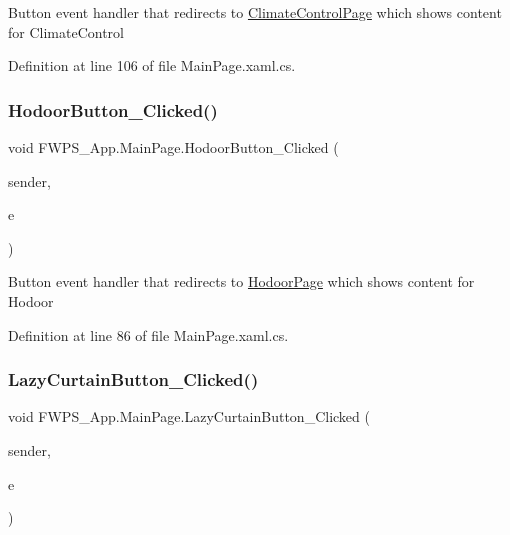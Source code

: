 Button event handler that redirects to \mbox{\hyperlink{class_f_w_p_s___app_1_1_climate_control_page}{Climate\+Control\+Page}} which shows content for Climate\+Control 

Definition at line 106 of file Main\+Page.\+xaml.\+cs.

\mbox{\label{class_f_w_p_s___app_1_1_main_page_a22b37582195ee5fd4fd31602d94b089a}} 
\subsubsection{\texorpdfstring{Hodoor\+Button\+\_\+\+Clicked()}{HodoorButton\_Clicked()}}
{\footnotesize\ttfamily void F\+W\+P\+S\+\_\+\+App.\+Main\+Page.\+Hodoor\+Button\+\_\+\+Clicked (\begin{DoxyParamCaption}\item[{object}]{sender,  }\item[{Event\+Args}]{e }\end{DoxyParamCaption})\hspace{0.3cm}{\ttfamily [private]}}

Button event handler that redirects to \mbox{\hyperlink{class_f_w_p_s___app_1_1_hodoor_page}{Hodoor\+Page}} which shows content for Hodoor 

Definition at line 86 of file Main\+Page.\+xaml.\+cs.

\mbox{\label{class_f_w_p_s___app_1_1_main_page_a042e5725fa41937b73c14cb1c6cc6732}} 
\subsubsection{\texorpdfstring{Lazy\+Curtain\+Button\+\_\+\+Clicked()}{LazyCurtainButton\_Clicked()}}
{\footnotesize\ttfamily void F\+W\+P\+S\+\_\+\+App.\+Main\+Page.\+Lazy\+Curtain\+Button\+\_\+\+Clicked (\begin{DoxyParamCaption}\item[{object}]{sender,  }\item[{Event\+Args}]{e }\end{DoxyParamCaption})\hspace{0.3cm}{\ttfamily [private]}}

